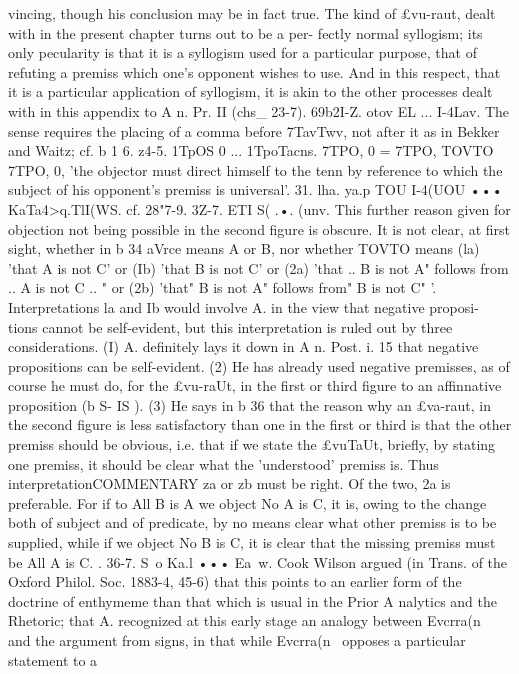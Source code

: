 {{{{{{{{{{{{{{{{{{{{{{{{{{{{{vincing, though his conclusion may be in fact true. The kind of
£vu-raut, dealt with in the present chapter turns out to be a per-
fectly normal syllogism; its only pecularity is that it is a syllogism
used for a particular purpose, that of refuting a premiss which
one's opponent wishes to use. And in this respect, that it is
a particular application of syllogism, it is akin to the other
processes dealt with in this appendix to A n. Pr. II (chs_ 23-7).
69b2I-Z. otov EL ... I-4Lav. The sense requires the placing of a
comma before 7TavTwv, not after it as in Bekker and Waitz; cf. b 1 6.
z4-5. 1TpOS 0 ... 1TpoTacns. 7TPO, 0 = 7TPO, TOVTO 7TPO, 0, 'the
objector must direct himself to the tenn by reference to which
the subject of his opponent's premiss is universal'.
31. lha. ya.p TOU I-4(UOU ••• KaTa4>q.TlI(WS. cf. 28"7-9.
3Z-7. ETI S( .•. (unv. This further reason given for objection
not being possible in the second figure is obscure. It is not clear,
at first sight, whether in b 34 aVrce means A or B, nor whether
TOVTO means (la) 'that A is not C' or (Ib) 'that B is not C' or
(2a) 'that .. B is not A" follows from .. A is not C .. " or (2b)
'that" B is not A" follows from" B is not C" '. Interpretations
la and Ib would involve A. in the view that negative proposi-
tions cannot be self-evident, but this interpretation is ruled
out by three considerations. (I) A. definitely lays it down in
A n. Post. i. 15 that negative propositions can be self-evident. (2)
He has already used negative premisses, as of course he must do,
for the £vu-raUt, in the first or third figure to an affinnative
proposition (b S- IS ). (3) He says in b 36 that the reason why an
£va-raut, in the second figure is less satisfactory than one in the
first or third is that the other premiss should be obvious, i.e. that
if we state the £vuTaUt, briefly, by stating one premiss, it should
be clear what the 'understood' premiss is. Thus interpretationCOMMENTARY
za or zb must be right. Of the two, 2a is preferable. For if
to All B is A we object No A is C, it is, owing to the change both
of subject and of predicate, by no means clear what other premiss
is to be supplied, while if we object No B is C, it is clear that the
missing premiss must be All A is C.
.
36-7. S~o Ka.l ••• Ea~w. Cook Wilson argued (in Trans. of the
Oxford Philol. Soc. 1883-4, 45-6) that this points to an earlier
form of the doctrine of enthymeme than that which is usual in
the Prior A nalytics and the Rhetoric; that A. recognized at this
early stage an analogy between Evcrra(n~ and the argument from
signs, in that while Evcrra(n~ opposes a particular statement to a
}}}}}}}}}}}}}}}}}}}}}}}}}}}}}
